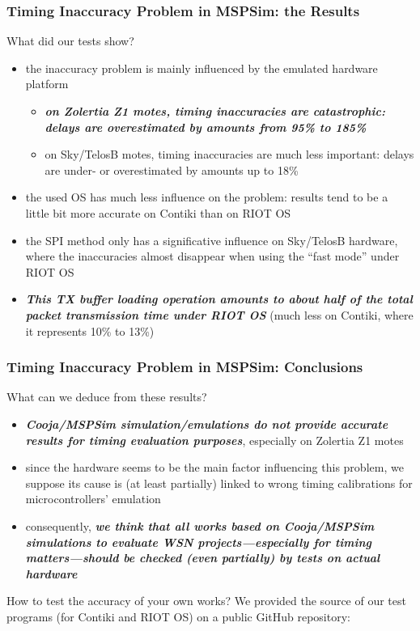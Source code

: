 \documentclass[10pt,c]{beamer}
\renewcommand{\emph}[1]{\textbf{\textit{#1}}}
\begin{document}
\begin{frame}
\frametitle{Timing Inaccuracy Problem in MSPSim: the Results}
\begin{block}{What did our tests show?}
\begin{itemize}
\item the inaccuracy problem is mainly influenced by the emulated hardware
platform
  \begin{itemize}
  \item \emph{on Zolertia Z1 motes, timing inaccuracies are catastrophic:
  delays are overestimated by amounts from 95\% to 185\%}
  \item on Sky/TelosB motes, timing inaccuracies are much less important:
  delays are under- or overestimated by amounts up to 18\%
  \end{itemize}
\item the used OS has much less influence on the problem: results tend
to be a little bit more accurate on Contiki than on RIOT OS
\item the SPI method only has a significative influence on Sky/TelosB
hardware, where the inaccuracies almost disappear when using the ``fast
mode'' under RIOT OS
\item \emph{This TX buffer loading operation amounts to about half
of the total packet transmission time under RIOT OS} (much less on
Contiki, where it represents 10\% to 13\%)
\end{itemize}
\end{block}
\end{frame}

\begin{frame}
\frametitle{Timing Inaccuracy Problem in MSPSim: Conclusions}
\vspace{-0.25cm}
\begin{alertblock}{What can we deduce from these results?}
\begin{itemize}
\item \emph{Cooja/MSPSim simulation/emulations do not provide accurate
results for timing evaluation purposes}, especially on Zolertia Z1 motes
\item since the hardware seems to be the main factor influencing this
problem, we suppose its cause is (at least partially) linked to wrong
timing calibrations for microcontrollers' emulation
\item consequently, \emph{we think that all works based on Cooja/MSPSim
simulations to evaluate WSN projects---especially for timing
matters---should be checked (even partially) by tests on actual hardware}
\end{itemize}
\end{alertblock}
\vspace{-0.25cm}
\begin{exampleblock}{How to test the accuracy of your own works?}
\small
We provided the source of our test programs (for Contiki and RIOT OS)
on a public GitHub repository:
\vspace{-0.25cm}
\end{exampleblock}
\end{frame}
\end{document}
